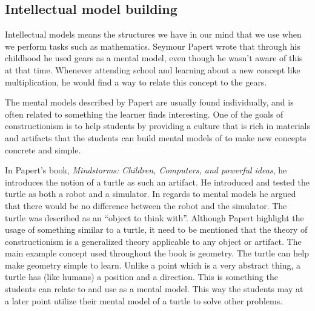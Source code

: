 
\subsection*{Intellectual model building}
Intellectual models means the structures we have in our mind that we use when we perform tasks such as mathematics. Seymour Papert wrote that through his childhood he used gears as a mental model, even though he wasn't aware of this at that time. Whenever attending school and learning about a new concept like multiplication, he would find a way to relate this concept to the gears. 

\bigskip\noindent
The mental models described by Papert are usually found individually, and is often related to something the learner finds interesting. 
One of the goals of constructionism is to help students by providing a culture that is rich in materials and artifacts that the students can build mental models of to make new concepts concrete and simple. 

\bigskip\noindent
In Papert's book, \textit{Mindstorms: Children, Computers, and powerful ideas}\cite{papert1980mindstorms}, he introduces the notion of a turtle as such an artifact. 
He introduced and tested the turtle as both a robot and a simulator. In regards to mental models he argued that there would be no difference between the robot and the simulator. The turtle was described as an ``object to think with''. Although Papert highlight the usage of something similar to a turtle, it need to be mentioned that the theory of constructionism is a generalized theory applicable to any object or artifact. 
The main example concept used throughout the book is geometry. The turtle can help make geometry simple to learn. Unlike a point which is a very abstract thing, a turtle has (like humans) a position and a direction. 
This is something the students can relate to and use as a mental model. 
This way the students may at a later point utilize their mental model of a turtle to solve other problems. 

